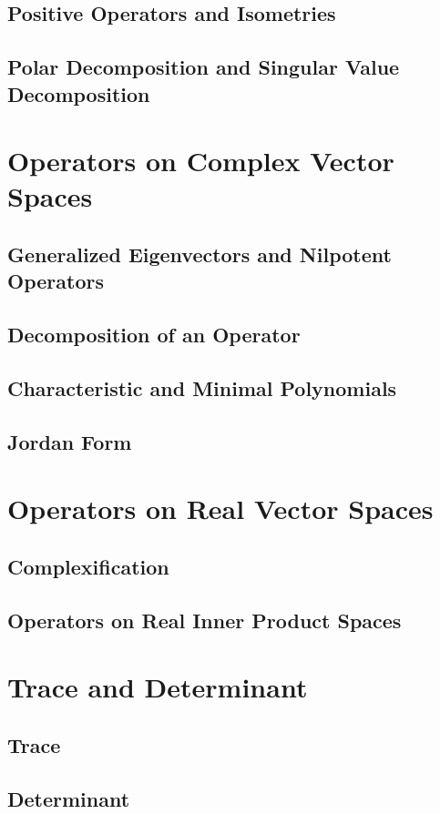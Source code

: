 \documentclass{article}
\begin{document}
\subsection{Positive Operators and Isometries}

\subsection{Polar Decomposition and Singular Value Decomposition}


\section{Operators on Complex Vector Spaces}
\subsection{Generalized Eigenvectors and Nilpotent Operators}

\subsection{Decomposition of an Operator}

\subsection{Characteristic and Minimal Polynomials}

\subsection{Jordan Form}


\section{Operators on Real Vector Spaces}
\subsection{Complexification}

\subsection{Operators on Real Inner Product Spaces}


\section{Trace and Determinant}
\subsection{Trace}

\subsection{Determinant}
\end{document}
